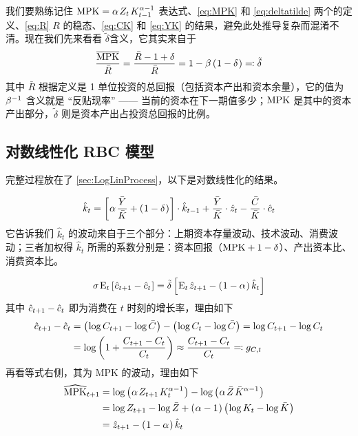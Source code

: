 我们要熟练记住 \(\n{MPK}=\alpha\,Z_t\,K\lt^{\alpha-1}\) 表达式、\ref{eq:MPK} 和 \ref{eq:deltatilde} 两个的定义、\ref{eq:R} \(R\) 的稳态、\ref{eq:CK} 和 \ref{eq:YK} 的结果，避免此处推导复杂而混淆不清。现在我们先来看看 \(\tilde\delta\)含义，它其实来自于
\begin{equation}
    \dfrac{\overline{\text{MPK}}}{\bar R}=\dfrac{\bar R-1+\delta}{\bar R}=1-\beta\left(\mspace{1mu}1-\delta\mspace{1mu}\right)\eqcolon\tilde\delta\label{eq:deltatilde2}
\end{equation}
其中 \(\bar R\) 根据定义是 1 单位投资的总回报（包括资本产出和资本余量），它的值为 \(\beta^{-1}\) 含义就是 “反贴现率” —— 当前的资本在下一期值多少；\(\text{MPK}\) 是其中的资本产出部分，\(\tilde\delta\) 则是资本产出占投资总回报的比例。

\subsection{对数线性化 RBC 模型}\label{subsec:LogLinRBC}

完整过程放在了 \ref{sec:LogLinProcess}，以下是对数线性化的结果。

\begin{equation}
    \hat k_t=\bks{\alpha\,\dfrac{\bar Y}{\bar K}+\bka{1-\delta}}\cdot\hat k\lt+\dfracb{Y}{K}\cdot\hat z_t-\dfracb{C}{K}\cdot\hat c_t
\end{equation}
它告诉我们 \(\hat k_t\) 的波动来自于三个部分：上期资本存量波动、技术波动、消费波动；三者加权得 \(\hat k_t\) 所需的系数分别是：资本回报（\(\text{MPK}+1-\delta\)）、产出资本比、消费资本比。

\begin{equation}
    \sigma\,\mean_t\bks{\hat c\nt-\hat c_t}=\tilde\delta\bks{\mean_t\,\hat z\nt-\bka{1-\alpha}\hat k_t}
\end{equation}
其中 \(\hat c_{t+1}-\hat c_t\) 即为消费在 \(t\) 时刻的增长率，理由如下
\begin{align*}
    \hat c_{t+1}-\hat c_t&=\left(\mspace{1mu}\operatorname{log} C_{t+1}-\operatorname{log}\bar C\mspace{1mu}\right)-\left(\mspace{1mu}\operatorname{log} C_t-\operatorname{log}\bar C\mspace{1mu}\right)=\operatorname{log} C_{t+1}-\operatorname{log} C_t\\
    &=\operatorname{log}\left(\mspace{1mu}1+\dfrac{C_{t+1}-C_t}{C_t}\mspace{1mu}\right)\approx\dfrac{C_{t+1}-C_t}{C_t}\eqcolon g_{C,t}
\end{align*}
再看等式右侧，其为 MPK 的波动，理由如下
\begin{align}
    \widehat{\n{MPK}}\nt &= \log\bka{\alpha\,Z\nt\,K_t^{\alpha-1}}-\log\bka{\alpha\,\bar Z\,\bar K^{\alpha-1}}\notag\\
    &=\log Z\nt-\log\bar Z+\bka{\alpha-1}\bka{\log K_t-\log\bar K}\notag\\
    &=\hat z\nt-\bka{1-\alpha}\hat k_t\label{eq:MPKhat}
\end{align}

